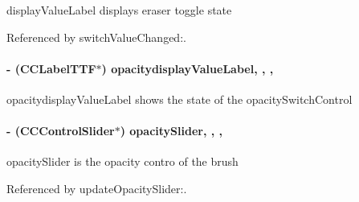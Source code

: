 display\-Value\-Label displays eraser toggle state 

Referenced by switch\-Value\-Changed\-:.

\hypertarget{interface_controls_layer_a1a60fd6edd83a2789b575845390a44be}{
\paragraph[{opacitydisplay\-Value\-Label}]{\setlength{\rightskip}{0pt plus 5cm}-\/ (C\-C\-Label\-T\-T\-F$\ast$) opacitydisplay\-Value\-Label\hspace{0.3cm}{\ttfamily [read]}, {\ttfamily [write]}, {\ttfamily [nonatomic]}, {\ttfamily [strong]}}}\label{d1/d1a/interface_controls_layer_a1a60fd6edd83a2789b575845390a44be}
opacitydisplay\-Value\-Label shows the state of the opacity\-Switch\-Control \hypertarget{interface_controls_layer_aff48213936f8ff3b2aa2f44d5125fc6f}{
\paragraph[{opacity\-Slider}]{\setlength{\rightskip}{0pt plus 5cm}-\/ (C\-C\-Control\-Slider$\ast$) opacity\-Slider\hspace{0.3cm}{\ttfamily [read]}, {\ttfamily [write]}, {\ttfamily [nonatomic]}, {\ttfamily [strong]}}}\label{d1/d1a/interface_controls_layer_aff48213936f8ff3b2aa2f44d5125fc6f}
opacity\-Slider is the opacity contro of the brush 

Referenced by update\-Opacity\-Slider\-:.

